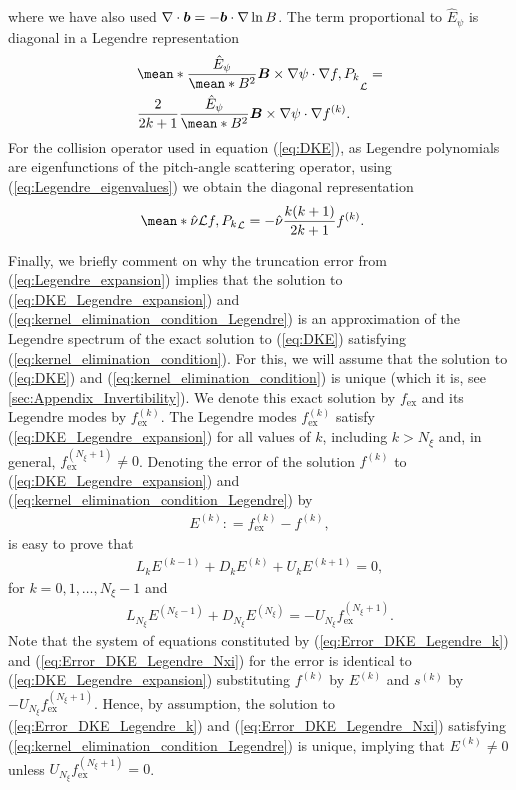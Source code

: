 where we have also used $\nabla\cdot\vb*{b}  = - \vb*{b}\cdot \nabla \ln B$. The term proportional to $\hat{E}_\psi$ is diagonal in a Legendre representation
%
\begin{align}
	&
	\mean*{\frac{\hat{E}_\psi}{\mean*{B^2}}
		\vb*{B}\times \nabla\psi \cdot\nabla f , P_k}_\Lorentz
	=
	\\ 
	&
	\frac{2}{2k+1}
	\frac{\hat{E}_\psi}{\mean*{B^2}}
	\vb*{B}\times \nabla\psi \cdot\nabla f^{(k)}.
	\nonumber
\end{align}
For the collision operator used in equation (\ref{eq:DKE}), as Legendre polynomials are eigenfunctions of the pitch-angle scattering operator, using (\ref{eq:Legendre_eigenvalues}) we obtain the diagonal representation 
%
\begin{align}
	\mean*{\hat{\nu} \Lorentz f , P_k}_\Lorentz
	&
	=
	-\hat{\nu}
	\frac{k(k+1)}{2k+1}	
	f^{(k)}.
\end{align}

Finally, we briefly comment on why the truncation error from (\ref{eq:Legendre_expansion}) implies that the solution to (\ref{eq:DKE_Legendre_expansion}) and (\ref{eq:kernel_elimination_condition_Legendre}) is an approximation of the Legendre spectrum of the exact solution to (\ref{eq:DKE}) satisfying (\ref{eq:kernel_elimination_condition}). For this, we will assume that the solution to (\ref{eq:DKE}) and (\ref{eq:kernel_elimination_condition}) is unique (which it is, see \ref{sec:Appendix_Invertibility}). We denote this exact solution by $f_{\text{ex}}$ and its Legendre modes by $f^{(k)}_{\text{ex}}$. The Legendre modes $f^{(k)}_{\text{ex}}$ satisfy (\ref{eq:DKE_Legendre_expansion}) for all values of $k$, including $k>N_\xi$ and, in general, $f^{(N_\xi+1)}_{\text{ex}}\ne 0$. Denoting the error of the solution $f^{(k)}$ to (\ref{eq:DKE_Legendre_expansion}) and (\ref{eq:kernel_elimination_condition_Legendre}) by
%
\begin{align}
	E^{(k)} : = f^{(k)}_{\text{ex}} - f^{(k)} ,
\end{align}
is easy to prove that
%
\begin{align}
	L_k E^{(k-1)} + D_k E^{(k)} + U_k E^{(k+1)} = 0, 
	\label{eq:Error_DKE_Legendre_k}
\end{align}
for $k =0,1,\ldots, N_\xi-1$ and 
%
\begin{align}
	L_{N_\xi} E^{(N_\xi-1)} + D_{N_\xi} E^{(N_\xi)} = - U_{N_\xi} f^{(N_\xi+1)}_{\text{ex}}.
	\label{eq:Error_DKE_Legendre_Nxi}
\end{align}
Note that the system of equations constituted by (\ref{eq:Error_DKE_Legendre_k}) and (\ref{eq:Error_DKE_Legendre_Nxi}) for the error is identical to (\ref{eq:DKE_Legendre_expansion}) substituting $f^{(k)}$ by $E^{(k)}$ and $s^{(k)}$ by $- U_{N_\xi} f^{(N_\xi+1)}_{\text{ex}}$. Hence, by assumption, the solution to (\ref{eq:Error_DKE_Legendre_k}) and (\ref{eq:Error_DKE_Legendre_Nxi}) satisfying (\ref{eq:kernel_elimination_condition_Legendre}) is unique, implying that $E^{(k)}\ne 0$ unless $ {U}_{N_\xi} f^{(N_\xi+1)}_{\text{ex}} = 0$.